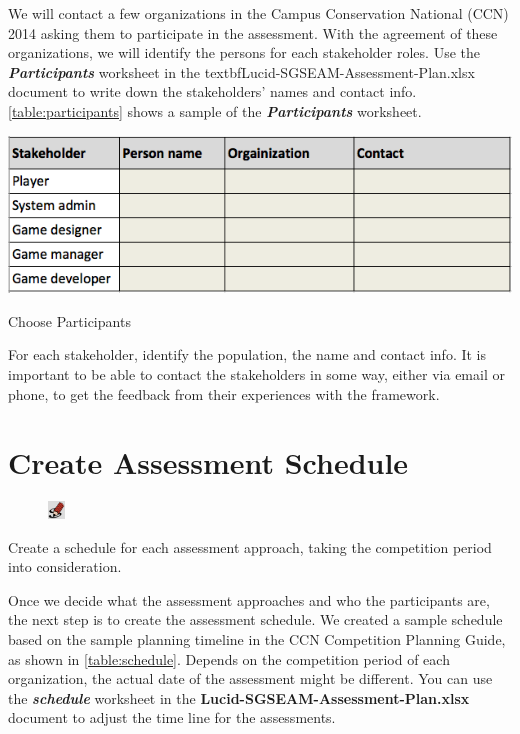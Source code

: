 \documentclass[11pt,oneside]{book}
\begin{document}
We will contact a few organizations in the Campus Conservation National (CCN) 2014 asking them to participate in the assessment. With the agreement of these organizations, we will identify the persons for each stakeholder roles. Use the \textbf{\textit{Participants}} worksheet in the textbf{Lucid-SGSEAM-Assessment-Plan.xlsx} document to write down the stakeholders' names and contact info.  \autoref{table:participants} shows a sample of the \textbf{\textit{Participants}} worksheet. 

\begin{table}[ht!]
  \center
  \includegraphics[width=0.7\columnwidth]{participant}
  \caption{Choose Participants}
  \label{table:participants}
\end{table}

For each stakeholder, identify the population, the name and contact info. It is important to be able to contact the stakeholders in some way, either via email or phone, to get the feedback from their experiences with the framework.

\section{Create Assessment Schedule}
\begin{shadebox}
\begin{figure}
\vspace{-15pt}\hspace{-10pt}
    \includegraphics[width=0.04\textwidth]{note-icon}
\end{figure}
Create a schedule for each assessment approach, taking the competition period into consideration.
\end{shadebox}

Once we decide what the assessment approaches and who the participants are, the next step is to create the assessment 
schedule. We created a sample schedule based on the sample planning timeline in the CCN Competition Planning Guide, as shown in \autoref{table:schedule}. Depends on the competition period of each organization, the actual date of the assessment might be different. You can use the \textbf{\textit{schedule}} worksheet in the \textbf{Lucid-SGSEAM-Assessment-Plan.xlsx} document to adjust the time line for the assessments.
\end{document}
